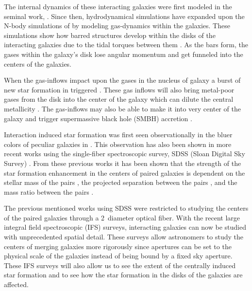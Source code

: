 \documentclass[iop,revtex4,twocolumn,apj,numberedappendix,appendixfloats]{emulateapj}
\begin{document}
The internal dynamics of these interacting galaxies were first modeled in the seminal work, \citet{Toomre:1972}. Since then, hydrodynamical simulations have expanded upon the N-body simulations of \citet{Toomre:1972} by modeling gas-dynamics within the galaxies. These simulations show how barred structures develop within the disks of the interacting galaxies due to the tidal torques between them \citep{Barnes:1991}. As the bars form, the gases within the galaxy's disk lose angular momentum and get funneled into the centers of the galaxies. 

When the gas-inflows impact upon the gases in the nucleus of galaxy a burst of new star formation in triggered \citep{Barnes:1996, Mihos:1996}. These gas inflows will also bring metal-poor gases from the disk into the center of the galaxy which can dilute the central metallicity \citep{Rupke:2010, Perez:2011, Scudder:2012}. The gas-inflows may also be able to make it into very center of the galaxy and trigger supermassive black hole (SMBH) accretion \citep{Capelo:2017}. 

Interaction induced star formation was first seen observationally in the bluer colors of peculiar galaxies in \citet{Larson:1978}. This observation has also been shown in more recent works using the single-fiber spectroscopic survey, SDSS (Sloan Digital Sky Survey) \citet{Ellison:2008, Li:2008, Scudder:2012, Patton:2013, Bustamante:2020}. From these previous works it has been shown that the strength of the star formation enhancement in the centers of paired galaxies is dependent on the stellar mass of the pairs \citet{Li:2008}, the projected separation between the pairs \citet{Ellison:2008, Li:2008, Scudder:2012}, and the mass ratio between the pairs \citet{Ellison:2008}. 

The previous mentioned works using SDSS were restricted to studying the centers of the paired galaxies through a 2\arcsec\ diameter optical fiber. With the recent large integral field spectroscopic (IFS) surveys, interacting galaxies can now be studied with unprecedented spatial detail. These surveys allow astronomers to study the centers of merging galaxies more rigorously since apertures can be set to the physical scale of the galaxies instead of being bound by a fixed sky aperture. These IFS surveys will also allow us to see the extent of the centrally induced star formation and to see how the star formation in the disks of the galaxies are affected. 
\end{document}
